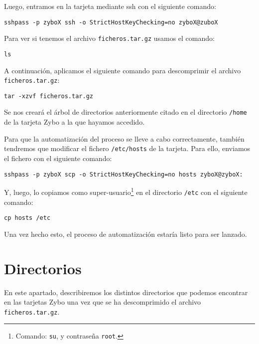 \documentclass[12pt,letterpaper]{article}
\begin{document}
Luego, entramos en la tarjeta mediante ssh con el siguiente comando:
\begin{center}
	\texttt{sshpass -p zyboX ssh -o StrictHostKeyChecking=no zyboX@zuboX}
\end{center}

Para ver si tenemos el archivo \texttt{ficheros.tar.gz} usamos el comando:
\begin{center}
	\texttt{ls}
\end{center}


A continuación, aplicamos el siguiente comando para descomprimir el archivo \texttt{ficheros.tar.gz}:
\begin{center}
	\texttt{tar -xzvf ficheros.tar.gz}
\end{center}

Se nos creará el árbol de directorios anteriormente citado en el directorio \texttt{/home} de la tarjeta Zybo a la que hayamos accedido.

Para que la automatización del proceso se lleve a cabo correctamente, también tendremos que modificar el fichero \texttt{/etc/hosts} de la tarjeta. Para ello, enviamos el fichero con el siguiente comando:
\begin{center}
	\texttt{sshpass -p zyboX scp -o StrictHostKeyChecking=no hosts zyboX@zyboX:}
\end{center}

Y, luego, lo copiamos como super-usuario\footnote{Comando: \texttt{su}, y contraseña \texttt{root}.} en el directorio \texttt{/etc} con el siguiente comando:
\begin{center}
	\texttt{cp hosts /etc}
\end{center}

Una vez hecho esto, el proceso de automatización estaría listo para ser lanzado.

\section{Directorios}
En este apartado, describiremos los distintos directorios que podemos encontrar en las tarjetas Zybo una vez que se ha descomprimido el archivo \texttt{ficheros.tar.gz}.
\end{document}

